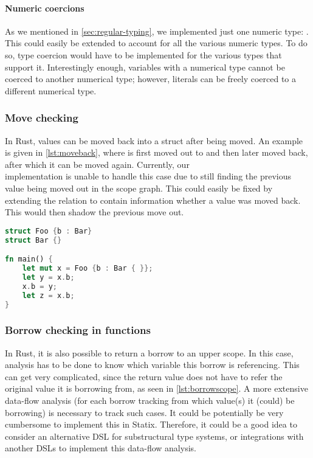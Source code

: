 \paragraph{Numeric coercions}

As we mentioned in \autoref{sec:regular-typing}, we implemented just one numeric type: . This could easily be extended to account for all the various numeric types. To do so, type coercion would have to be implemented for the various types that support it. Interestingly enough, variables with a numerical type cannot be coerced to another numerical type; however, literals can be freely coerced to a different numerical type.   

\subsubsection{Move checking}
In Rust, values can be moved back into a struct after being moved. An example is given in \autoref{lst:moveback}, where  is first moved out to  and then later moved back, after which it can be moved again. Currently, our\\ implementation is unable to handle this case due to still finding the previous value being moved out in the scope graph. This could easily be fixed by extending the relation to contain information whether a value was moved back. This would then shadow the previous move out.   

\begin{lstlisting}[language=rust, showstringspaces=false, escapechar=~, label={lst:moveback}, caption={Example of moving a value back}]
struct Foo {b : Bar}
struct Bar {}

fn main() { 
    let mut x = Foo {b : Bar { }}; 
    let y = x.b;
    x.b = y;
    let z = x.b; 
}
\end{lstlisting}

\subsubsection{Borrow checking in functions}
In Rust, it is also possible to return a borrow to an upper scope. In this case, analysis has to be done to know which variable this borrow is referencing. This can get very complicated, since the return value does not have to refer the original value it is borrowing from, as seen in \autoref{lst:borrowscope}. A more extensive data-flow analysis (for each borrow tracking from which value(s) it (could) be borrowing) is necessary to track such cases. It could be potentially be very cumbersome to implement this in Statix. Therefore, it could be a good idea to consider an alternative DSL for substructural type systems, or integrations with another DSLs to implement this data-flow analysis. 

